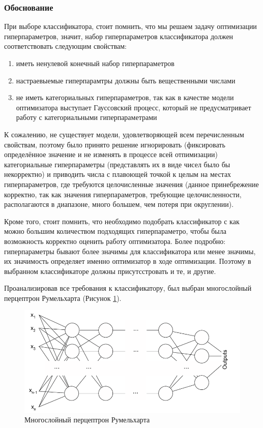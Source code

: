 \documentclass[times,specification,annotation]{itmo-student-thesis}
\begin{document}
		\subsubsection{Обоснование}
		При выборе классификатора, стоит помнить, что мы решаем задачу оптимизации гиперпараметров, значит, набор гиперпараметров классификатора должен соответствовать следующим свойствам: 
		\begin{enumerate}
			\item иметь ненулевой конечный набор гиперпараметров
			\item настраевыемые гиперпарамтры должны быть вещественными числами
			\item не иметь категориальных гиперпараметров, так как в качестве модели оптимизатора выступает Гауссовский процесс, который не предусматривает работу с категориальными гиперпараметрами
		\end{enumerate}
		К сожалению, не существует модели, удовлетворяющей всем перечисленным свойствам, поэтому было принято решение игнорировать (фиксировать определённое значение и не изменять в процессе всей отпимизации) категориальные гиперпараметры (представлять их в виде чисел было бы некорректно) и приводить числа с плавоющей точкой к целым на местах гиперпараметров, где требуются целочисленные значения (данное принебрежение корректно, так как значения гиперпараметров, требующие целочисленности, располагаются в диапазоне, много большем, чем потеря при округлении).\par
		Кроме того, стоит помнить, что необходимо подобрать классификатор с как можно большим количеством подходящих гиперпараметро, чтобы была возможность корректно оценить работу оптимизатора. Более подробно: гиперпараметры бывают более значимы для классификатора или менее значимы, их значимость определяет именно оптимизатор в ходе оптимизации. Поэтому в выбранном классификаторе должны присутсстровать и те, и другие.\par
		Проанализировав все требования к классификатору, был выбран многослойный перцептрон Румельхарта \cite{article, hastie_09_elements-of.statistical-learning} (Рисунок \ref{img:parceptron}).
		\begin{figure}[!ht]
			\caption{Многослойный перцептрон Румельхарта\cite{hastie_09_elements-of.statistical-learning}}\label{img:parceptron}
			\includegraphics[width=0.85\linewidth]{parceptrone}
			\centering
		\end{figure}
\end{document}
